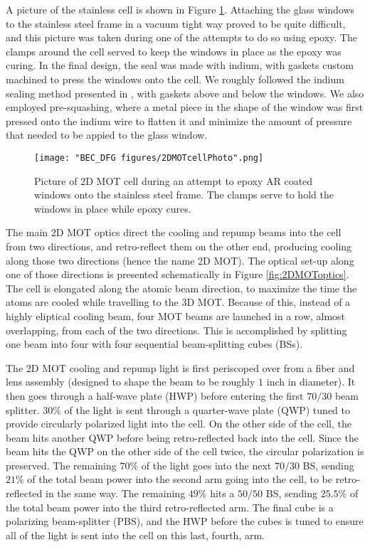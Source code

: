 A picture of the stainless cell is shown in Figure \ref{fig:2DMOTcellPhoto}. Attaching the glass windows to the stainless steel frame in a vacuum tight way proved to be quite difficult, and this picture was taken during one of the attempts to do so using epoxy. The clamps around the cell served to keep the windows in place as the epoxy was curing. In the final design, the seal was made with indium, with gaskets custom machined to press the windows onto the cell. We roughly followed the indium sealing method presented in \cite{Weatherill2009}, with gaskets above and below the windows. We also employed pre-squashing, where a metal piece in the shape of the window was first pressed onto the indium wire to flatten it and minimize the amount of pressure that needed to be appied to the glass window.  
\begin{figure}
	\texttt{[image: "BEC\_DFG figures/2DMOTcellPhoto".png]}
\caption[Picture of 2D MOT cell]{Picture of 2D MOT cell during an attempt to epoxy AR coated windows onto the stainless steel frame. The clamps serve to hold the windows in place while epoxy cures.}
\label{fig:2DMOTcellPhoto}
\end{figure}

The main 2D MOT optics direct the cooling and repump beams into the cell from two directions, and retro-reflect them on the other end, producing cooling along those two directions (hence the name 2D MOT). The optical set-up along one of those directions is presented schematically in Figure \ref{fig:2DMOToptics}. The cell is elongated along the atomic beam direction, to maximize the time the atoms are cooled while travelling to the 3D MOT. Because of this, instead of a highly eliptical cooling beam, four MOT beams are launched in a row, almost overlapping, from each of the two directions. This is accomplished by splitting one beam into four with four sequential beam-splitting cubes (BSs). 

The 2D MOT cooling and repump light is first periscoped over from a fiber and lens assembly (designed to shape the beam to be roughly $1$ inch in diameter). It then goes through a half-wave plate (HWP) before entering the first $70/30$ beam splitter. $30\%$ of the light is sent through a quarter-wave plate (QWP) tuned to provide circularly polarized light into the cell. On the other side of the cell, the beam hits another QWP before being retro-reflected back into the cell. Since the beam hits the QWP on the other side of the cell twice, the circular polarization is preserved.  The remaining  $70\%$ of the light goes into the next $70/30$ BS, sending $21\%$ of the total beam power into the second arm going into the cell, to be retro-reflected in the same way. The remaining $49\%$ hits a $50/50$ BS, sending $25.5\%$ of the total beam power into the third retro-reflected arm. The final cube is a polarizing beam-splitter (PBS), and the HWP before the cubes is tuned to ensure all of the light is sent into the cell on this last, fourth, arm. 

